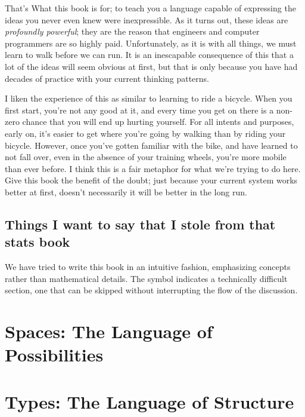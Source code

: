 \documentclass[12pt]{book}
\newcommand{\difficult}{}
\begin{document}
That's What this book is for; to teach you a language capable of
expressing the ideas you never even knew were inexpressible. As it turns out, these ideas are \textit{profoundly
powerful}; they are the reason that engineers and computer programmers are so highly paid. Unfortunately, as it is with
all things, we must learn to walk before we can run. It is an inescapable consequence of this that a lot of the ideas
will seem obvious at first, but that is only because you have had decades of practice with your current thinking
patterns.

I liken the experience of this as similar to learning to ride a bicycle.
When you first start, you're not any good at it, and every time you get on there is a non-zero chance that you will end
up hurting yourself. For all intents and purposes, early on, it's easier to get where you're going by walking than by
riding your bicycle. However, once you've gotten familiar with the bike, and have learned to not fall over, even in the
absence of your training wheels, you're more mobile than ever before. I think this is a fair metaphor for what we're
trying to do here. Give this book the benefit of the doubt; just because your current system works better at first,
doesn't necessarily it will be better in the long run.

\section{Things I want to say that I stole from that stats book}
We have tried to write this book in an intuitive fashion, emphasizing concepts rather than mathematical details.
The symbol \difficult indicates a technically difficult section, one that can be skipped without interrupting the flow
of the discussion.



\chapter{Spaces: The Language of Possibilities}
\chapter{Types: The Language of Structure}
\end{document}
